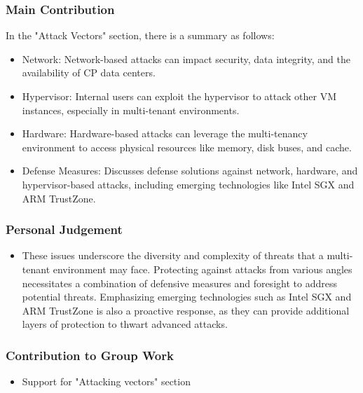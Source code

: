 \documentclass[12pt, twoside]{article}
\begin{document}
\subsubsection{Main Contribution}
In the "Attack Vectors" section, there is a summary as follows:
\begin{itemize}
    \item Network: Network-based attacks can impact security, data integrity, and the availability of CP data centers.
    \item Hypervisor: Internal users can exploit the hypervisor to attack other VM instances, especially in multi-tenant environments.
    \item Hardware: Hardware-based attacks can leverage the multi-tenancy environment to access physical resources like memory, disk buses, and cache.
    \item Defense Measures: Discusses defense solutions against network, hardware, and hypervisor-based attacks, including emerging technologies like Intel SGX and ARM TrustZone.
\end{itemize}

\subsubsection{Personal Judgement}
\begin{itemize}
    \item These issues underscore the diversity and complexity of threats that a multi-tenant environment may face. Protecting against attacks from various angles necessitates a combination of defensive measures and foresight to address potential threats. Emphasizing emerging technologies such as Intel SGX and ARM TrustZone is also a proactive response, as they can provide additional layers of protection to thwart advanced attacks.
\end{itemize}

\subsubsection{Contribution to Group Work}
\begin{itemize}
    \item Support for "Attacking vectors" section
\end{itemize}
\newpage
\renewcommand{\refname}{References}


\end{document}
